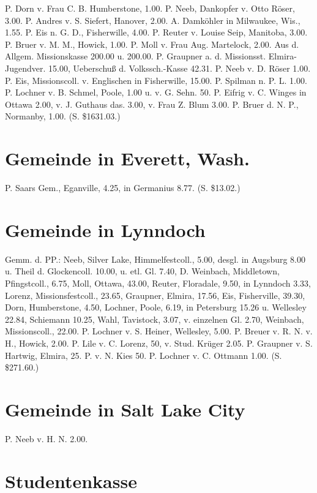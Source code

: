 P. Dorn v. Frau C. B. Humberstone, 1.00. P. Neeb, Dankopfer v. Otto Röser, 3.00. P. Andres v. S. Siefert, Hanover, 2.00. A. Damköhler in Milwaukee, Wis., 1.55. P. Eis n. G. D., Fisherwille, 4.00. P. Reuter v. Louise Seip, Manitoba, 3.00. P. Bruer v. M. M., Howick, 1.00. P. Moll v. Frau Aug. Martelock, 2.00. Aus d. Allgem. Missionskasse 200.00 u. 200.00. P. Graupner a. d. Missionsst. Elmira-Jugendver. 15.00, Ueberschuß d. Volkssch.-Kasse 42.31. P. Neeb v. D. Röser 1.00. P. Eis, Missionscoll. v. Englischen in Fisherwille, 15.00. P. Spilman n. P. L. 1.00. P. Lochner v. B. Schmel, Poole, 1.00 u. v. G. Sehn. 50. P. Eifrig v. C. Winges in Ottawa 2.00, v. J. Guthaus das. 3.00, v. Frau Z. Blum 3.00. P. Bruer d. N. P., Normanby, 1.00. (S. \$1631.03.)

\section{Gemeinde in Everett, Wash.}

P. Saars Gem., Eganville, 4.25, in Germanius 8.77. (S. \$13.02.)

\section{Gemeinde in Lynndoch}

Gemm. d. PP.: Neeb, Silver Lake, Himmelfestcoll., 5.00, desgl. in Augsburg 8.00 u. Theil d. Glockencoll. 10.00, u. etl. Gl. 7.40, D. Weinbach, Middletown, Pfingstcoll., 6.75, Moll, Ottawa, 43.00, Reuter, Floradale, 9.50, in Lynndoch 3.33, Lorenz, Missionsfestcoll., 23.65, Graupner, Elmira, 17.56, Eis, Fisherville, 39.30, Dorn, Humberstone, 4.50, Lochner, Poole, 6.19, in Petersburg 15.26 u. Wellesley 22.84,
Schiemann 10.25, Wahl, Tavistock, 3.07, v. einzelnen Gl. 2.70, Weinbach, Missionscoll., 22.00. P. Lochner v. S. Heiner, Wellesley, 5.00. P. Breuer v. R. N. v. H., Howick, 2.00. P. Lile v. C. Lorenz, 50, v. Stud. Krüger 2.05. P. Graupner v. S. Hartwig, Elmira, 25. P. v. N. Kies 50. P. Lochner v. C. Ottmann 1.00. (S. \$271.60.)

\section{Gemeinde in Salt Lake City}

P. Neeb v. H. N. 2.00.

\section{Studentenkasse}

